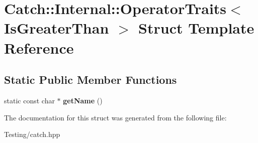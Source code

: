 \hypertarget{struct_catch_1_1_internal_1_1_operator_traits_3_01_is_greater_than_01_4}{\section{Catch\-:\-:Internal\-:\-:Operator\-Traits$<$ Is\-Greater\-Than $>$ Struct Template Reference}
\label{struct_catch_1_1_internal_1_1_operator_traits_3_01_is_greater_than_01_4}
}
\subsection*{Static Public Member Functions}
\begin{DoxyCompactItemize}
\item 
\hypertarget{struct_catch_1_1_internal_1_1_operator_traits_3_01_is_greater_than_01_4_ab917bfb9ccbe461dc684ee5a34d67d27}{static const char $\ast$ {\bfseries get\-Name} ()}\label{struct_catch_1_1_internal_1_1_operator_traits_3_01_is_greater_than_01_4_ab917bfb9ccbe461dc684ee5a34d67d27}

\end{DoxyCompactItemize}


The documentation for this struct was generated from the following file\-:\begin{DoxyCompactItemize}
\item 
Testing/catch.\-hpp\end{DoxyCompactItemize}
